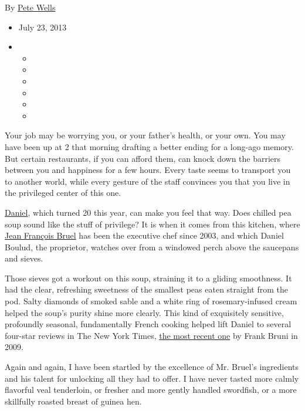 By \href{https://www.nytimes.com/by/pete-wells}{Pete Wells}

\begin{itemize}
\item
  July 23, 2013
\item
  \begin{itemize}
  \item
  \item
  \item
  \item
  \item
  \item
  \end{itemize}
\end{itemize}

Your job may be worrying you, or your father's health, or your own. You
may have been up at 2 that morning drafting a better ending for a
long-ago memory. But certain restaurants, if you can afford them, can
knock down the barriers between you and happiness for a few hours. Every
taste seems to transport you to another world, while every gesture of
the staff convinces you that you live in the privileged center of this
one.

\href{http://danielnyc.com/}{Daniel}, which turned 20 this year, can
make you feel that way. Does chilled pea soup sound like the stuff of
privilege? It is when it comes from this kitchen, where
\href{http://danielnyc.com/jean-francois-bruel-executive-chef}{Jean
François Bruel} has been the executive chef since 2003, and which Daniel
Boulud, the proprietor, watches over from a windowed perch above the
saucepans and sieves.

Those sieves got a workout on this soup, straining it to a gliding
smoothness. It had the clear, refreshing sweetness of the smallest peas
eaten straight from the pod. Salty diamonds of smoked sable and a white
ring of rosemary-infused cream helped the soup's purity shine more
clearly. This kind of exquisitely sensitive, profoundly seasonal,
fundamentally French cooking helped lift Daniel to several four-star
reviews in The New York Times,
\href{http://www.nytimes.com/2009/01/21/dining/reviews/21rest.html?pagewanted=all}{the
most recent one} by Frank Bruni in 2009.

Again and again, I have been startled by the excellence of Mr. Bruel's
ingredients and his talent for unlocking all they had to offer. I have
never tasted more calmly flavorful veal tenderloin, or fresher and more
gently handled swordfish, or a more skillfully roasted breast of guinea
hen.

